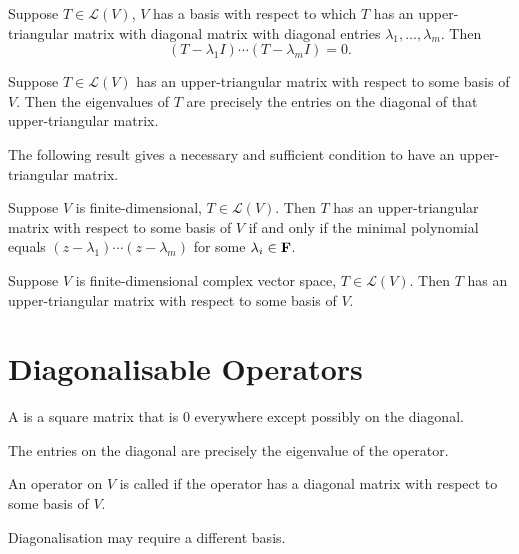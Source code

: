 \begin{lemma}
Suppose $T\in\mathcal{L}(V)$, $V$ has a basis with respect to which $T$ has an upper-triangular matrix with diagonal matrix with diagonal entries $\lambda_1,\dots,\lambda_m$. Then
\[(T-\lambda_1I)\cdots(T-\lambda_mI)=0.\]
\end{lemma}

\begin{proposition}
Suppose $T\in\mathcal{L}(V)$ has an upper-triangular matrix with respect to some basis of $V$. Then the eigenvalues of $T$ are precisely the entries on the diagonal of that upper-triangular matrix.
\end{proposition}

The following result gives a necessary and sufficient condition to have an upper-triangular matrix.

\begin{lemma}
Suppose $V$ is finite-dimensional, $T\in\mathcal{L}(V)$. Then $T$ has an upper-triangular matrix with respect to some basis of $V$ if and only if the minimal polynomial equals $(z-\lambda_1)\cdots(z-\lambda_m)$ for some $\lambda_i\in\mathbf F$.
\end{lemma}

\begin{theorem}
Suppose $V$ is finite-dimensional complex vector space, $T\in\mathcal{L}(V)$. Then $T$ has an upper-triangular matrix with respect to some basis of $V$.
\end{theorem}
\pagebreak

\section{Diagonalisable Operators}
\begin{definition}
A  is a square matrix that is $0$ everywhere except possibly on the diagonal.
\end{definition}

\begin{remark}
The entries on the diagonal are precisely the eigenvalue of the operator.
\end{remark}

\begin{definition}[Diagonalisable]
An operator on $V$ is called  if the operator has a diagonal matrix with respect to some basis of $V$.
\end{definition}

\begin{remark}
Diagonalisation may require a different basis.
\end{remark}

